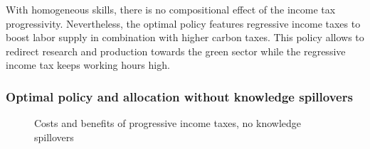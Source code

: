 With homogeneous skills, there is no compositional effect of the income tax progressivity. Nevertheless, the optimal policy features regressive income taxes to boost labor supply in combination with higher carbon taxes. This policy allows to redirect research and production towards the green sector while the regressive income tax keeps working hours high. %
\clearpage
\subsubsection{Optimal policy and allocation without knowledge spillovers}
\begin{figure}[h!!!]
	\centering
	\caption{Costs and benefits of progressive income taxes, no knowledge spillovers %
	}\label{fig:optAll_percLf_dyn_noknow}
	\begin{minipage}[]{0.32\textwidth}

\end{minipage}
\end{figure}
